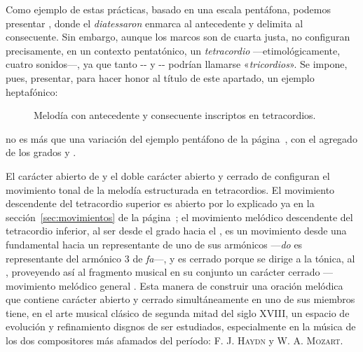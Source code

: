 \documentclass[a4paper,12pt]{article}
\begin{document}
\begin{multicols}{2}
  Como ejemplo de estas prácticas, basado en una escala pentáfona, podemos presentar
  \hbox{,}\label{ej:tetra-penta} donde el \emph{diatessaron}  enmarca al antecedente y  delimita al consecuente. Sin embargo, aunque los marcos son de cuarta justa, no configuran precisamente, en un contexto pentatónico, un \emph{tetracordio} ---etimológicamente, cuatro sonidos---, ya que tanto -- y -- podrían llamarse «\emph{tricordios}». Se impone, pues, presentar, para hacer honor al título de este apartado, un ejemplo heptafónico:
  \end{multicols}

  \begin{figure}[ht]
\centering
{}
\caption{Melodía con antecedente y consecuente inscriptos en tetracordios.}\label{fig:tetra-hepta}
\end{figure}

\begin{multicols}{2}
  \noindent no es más que una variación del ejemplo pentáfono de la página~\pageref{ej:tetra-penta}, con el agregado de los grados  y .

  El carácter abierto de  y el doble carácter abierto y cerrado de  configuran el movimiento tonal de la melodía estructurada en tetracordios. El movimiento descendente del tetracordio superior es abierto por lo explicado ya en la sección~\ref{sec:movimientos} de la página~\pageref{sec:movimientos}; el movimiento melódico descendente del tetracordio inferior, al ser desde el  grado hacia el , es un movimiento desde una fundamental hacia un representante de uno de sus armónicos ---\emph{do} es representante del armónico 3 de \emph{fa}---, y es cerrado porque se dirige a la tónica, al , proveyendo así al fragmento musical en su conjunto un carácter cerrado ---movimiento melódico general . Esta manera de construir una oración melódica que contiene carácter abierto y cerrado simultáneamente en uno de sus miembros tiene, en el arte musical clásico de segunda mitad del siglo XVIII, un espacio de evolución y refinamiento disgnos de ser estudiados, especialmente en la música de los dos compositores más afamados del período: \textsc{F. J. Haydn} y \textsc{W. A. Mozart}.
\end{multicols}
\end{document}
